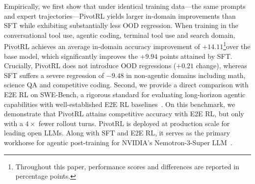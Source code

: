 Empirically, we first show that under identical training data---the same prompts and expert trajectories---PivotRL yields larger in-domain improvements than SFT while exhibiting substantially less OOD regression. 
{When training in the conversational tool use, agentic coding, terminal tool use and search domain,}
PivotRL achieves an average in-domain accuracy improvement of $+14.11$\footnote{Throughout this paper, performance scores and differences are reported in percentage points.}over the base model, which significantly improves the $+9.94$ points attained by SFT. Crucially, PivotRL does not introduce OOD regressions (+$0.21$ change), whereas SFT suffers a severe regression of $-9.48$ in non-agentic domains including math, science QA and competitive coding. Second, we provide a direct comparison with E2E RL on SWE-Bench, a rigorous standard for evaluating long-horizon agentic capabilities with well-established E2E RL baselines~\citep{jimenez2024swebench, wang2025openhandsopenplatformai}. On this benchmark, we demonstrate that PivotRL attains competitive accuracy with E2E RL, but only with a {$4\times$ fewer rollout turns.} 
{PivotRL is deployed at production scale for leading open LLMs. Along with SFT and E2E RL, it serves as the primary workhorse for agentic post-training for NVIDIA's Nemotron-3-Super LLM~\citep{nvidia2025nemotron3super}.}

